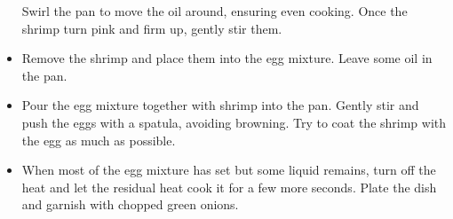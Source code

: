 \documentclass{article}
\begin{document}
\begin{paracol}{2}
\begin{itemize}
        Swirl the pan to move the oil around, ensuring even cooking.
        Once the shrimp turn pink and firm up, gently stir them.
        \item Remove the shrimp and place them into the egg mixture. Leave some oil in the pan.
        \item Pour the egg mixture together with shrimp into the pan. 
        Gently stir and push the eggs with a spatula, avoiding browning. 
        Try to coat the shrimp with the egg as much as possible.
        \item When most of the egg mixture has set but some liquid remains,
        turn off the heat and let the residual heat cook it for a few more seconds.
        Plate the dish and garnish with chopped green onions.
    \end{itemize}
\end{paracol}
\end{document}
